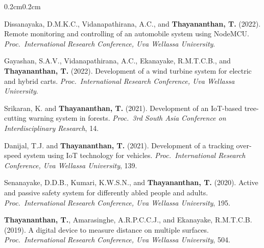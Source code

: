 \documentclass[10pt, letterpaper]{article}
\newcommand{\textbfr}[1]{\textbf{#1}}
\newenvironment{onecolentry}{%
    \begin{adjustwidth}{0.2cm}{0.2cm}
}{\end{adjustwidth}}
\newenvironment{pubsU}{%
  \begin{enumerate}[label={[U\arabic*]}, leftmargin=1.15cm, labelsep=0.2cm,
                    topsep=0.08cm, parsep=0.08cm, partopsep=0pt, itemsep=0pt]
}{\end{enumerate}}
\begin{document}
\begin{onecolentry}
\begin{pubsU}
    \item Dissanayaka, D.M.K.C., Vidanapathirana, A.C., and
    \textbfr{Thayananthan, T.} (2022). Remote monitoring and controlling of an
    automobile system using NodeMCU. \emph{Proc.\ International Research Conference,
    Uva Wellassa University}.

    \item Gayashan, S.A.V., Vidanapathirana, A.C., Ekanayake, R.M.T.C.B., and
    \textbfr{Thayananthan, T.} (2022). Development of a wind turbine system for
    electric and hybrid carts. \emph{Proc.\ International Research Conference,
    Uva Wellassa University}.

    \item Srikaran, K. and \textbfr{Thayananthan, T.} (2021). Development of an
    IoT-based tree-cutting warning system in forests. \emph{Proc.\ 3rd South Asia
    Conference on Interdisciplinary Research}, 14.

    \item Danijal, T.J. and \textbfr{Thayananthan, T.} (2021). Development of a
    tracking over-speed system using IoT technology for vehicles.
    \emph{Proc.\ International Research Conference, Uva Wellassa University}, 139.

    \item Senanayake, D.D.B., Kumari, K.W.S.N., and \textbfr{Thayananthan, T.}
    (2020). Active and passive safety system for differently abled people and adults.
    \emph{Proc.\ International Research Conference, Uva Wellassa University}, 195.

    \item \textbfr{Thayananthan, T.}, Amarasinghe, A.R.P.C.C.J., and
    Ekanayake, R.M.T.C.B. (2019). A digital device to measure distance on multiple
    surfaces. \emph{Proc.\ International Research Conference, Uva Wellassa
    University}, 504.
\end{pubsU}
\end{onecolentry}
\vspace{0.18cm}

\end{document}
